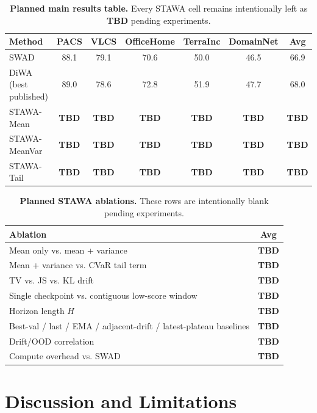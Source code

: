 \documentclass{article}
\newcommand{\TBD}{\textbf{TBD}}
\newcommand{\ood}{OOD}
\newcommand{\stawa}{\textup{\textsc{STAWA}}}
\newcommand{\swad}{\textup{\textsc{SWAD}}}
\begin{document}
\begin{table}[t]
    \centering
    \small
    \caption{\textbf{Planned main results table.} Every \stawa{} cell remains intentionally left as \TBD{} pending experiments.}
    \label{tab:main_tbd}
    \begin{tabular}{lcccccc}
        \toprule
        Method & PACS & VLCS & OfficeHome & TerraInc & DomainNet & Avg \\
        \midrule
        \swad{} & 88.1 & 79.1 & 70.6 & 50.0 & 46.5 & 66.9 \\
        DiWA (best published) & 89.0 & 78.6 & 72.8 & 51.9 & 47.7 & 68.0 \\
        \stawa-Mean & \TBD & \TBD & \TBD & \TBD & \TBD & \TBD \\
        \stawa-MeanVar & \TBD & \TBD & \TBD & \TBD & \TBD & \TBD \\
        \stawa-Tail & \TBD & \TBD & \TBD & \TBD & \TBD & \TBD \\
        \bottomrule
    \end{tabular}
\end{table}

\begin{table}[t]
    \centering
    \small
    \caption{\textbf{Planned \stawa{} ablations.} These rows are intentionally blank pending experiments.}
    \label{tab:ablations}
    \begin{tabular}{lc}
        \toprule
        Ablation & Avg \\
        \midrule
        Mean only vs. mean + variance & \TBD \\
        Mean + variance vs. CVaR tail term & \TBD \\
        TV vs. JS vs. KL drift & \TBD \\
        Single checkpoint vs. contiguous low-score window & \TBD \\
        Horizon length $H$ & \TBD \\
        Best-val / last / EMA / adjacent-drift / latest-plateau baselines & \TBD \\
        Drift/\ood{} correlation & \TBD \\
        Compute overhead vs. \swad{} & \TBD \\
        \bottomrule
    \end{tabular}
\end{table}

\section{Discussion and Limitations}
\end{document}
